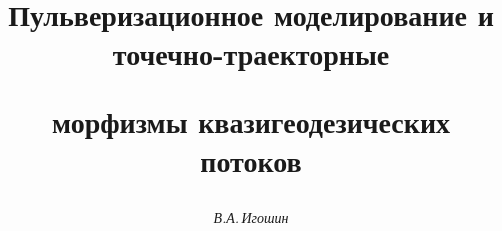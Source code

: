 

 




\newcommand{\pr}{\operatorname{Pr}} 


\newcommand{\const}{\operatorname{const}} 


\newcommand{\down}[2]{\underset{#1}{#2}{}} 


\newcommand{\up}[2]{\overset{#1}{#2}{}} 


\newcommand{\myspace}{\hspace{4.6mm}} 


\newcommand{\tts}[1]{} 


 




 


\setcounter{page}{11} 












 


\author{\it В.А.\,Игошин } 




\title{Пульверизационное моделирование и точечно-траекторные 


морфизмы квазигеодезических потоков} 


 


\date{} 




\pagestyle{plain} %


